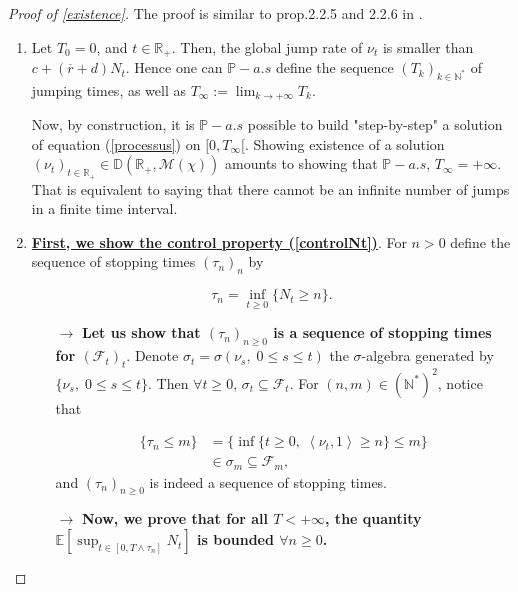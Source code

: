 \documentclass[a4paper,11pt]{article}
\newcommand{\itemb}{\item[$\bullet$]}
\begin{document}
\begin{proof}[Proof of \ref{existence}]
The proof is similar to prop.2.2.5 and 2.2.6 in \cite{fournier_microscopic_2004}.

\begin{enumerate}
\item Let $T_0=0$, and $t\in \mathbb{R}_+$. Then, the global jump rate of $\nu_t$ is smaller than $c + (\overline{r}+d)N_t$. Hence one can $\mathbb{P}-a.s$ define the sequence $(T_k)_{k\in\mathbb{N}^*}$ of jumping times, as well as 
$T_\infty := \lim_{k\rightarrow +\infty} T_k$.\par 

Now, by construction, it is $\mathbb{P}-a.s$ possible to build "step-by-step" a solution of equation (\ref{processus}) on $[0,T_\infty[$. Showing existence of a solution $(\nu_t)_{t\in \mathbb{R}_+} \in \mathbb{D}(\mathbb{R}_+,\mathcal{M}(\chi))$ amounts to showing that $\mathbb{P}-a.s$, $T_\infty = +\infty$. That is equivalent to saying that there cannot be an infinite number of jumps in a finite time interval. \par 

\itemb \textbf{\underline{First, we show the control property (\ref{controlNt})}}. For $n>0$ define the sequence of stopping times $(\tau_n)_n$ by

\begin{displaymath}
\tau_n = \inf_{t \geq 0} \{N_t \geq n\}.
\end{displaymath}

\begin{itemize}
\item[$\rightarrow$] \boldmath \textbf{Let us show that $(\tau_n)_{n\geq 0} $  is a sequence of stopping times for $(\mathcal{F}_t)_t$}. \unboldmath Denote $\sigma_t=\sigma(\nu_s, \; 0\leq s \leq t)$ the $\sigma$-algebra generated by $\{\nu_s,\;0\leq s \leq t\}$. Then $\forall t\geq0$, $\sigma_t \subseteq \mathcal{F}_t$. For $(n,m)\in \left(\mathbb{N}^*\right)^2$, notice that
 
\begin{displaymath}
\begin{aligned}
\{\tau_n \leq m \} &= \{\inf\{t\geq 0 ,\; \left< \nu_t,1\right> \geq n \} \leq m \} \\
& \in \sigma_m \subseteq \mathcal{F}_m,
\end{aligned}
\end{displaymath}
and $(\tau_n)_{n\geq 0} $ is indeed a sequence of stopping times.

\item[$\rightarrow$]\boldmath \textbf{Now, we prove that for all $T<+\infty$, the quantity 
$\mathbb{E}\left[ \sup_{t\in [0,T \wedge \tau_n]} N_t \right]$ is bounded $\forall n\geq 0$.} \unboldmath \par 



\end{itemize}
\end{enumerate}
\end{proof}
\end{document}
